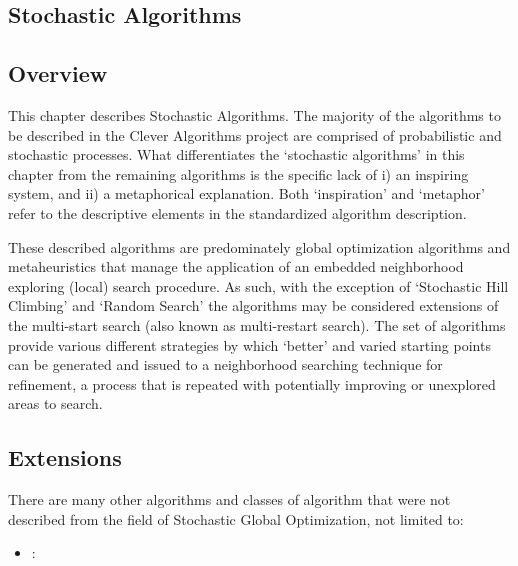 

\renewcommand{\bibsection}{\subsection{\bibname}}
\begin{bibunit}

\chapter{Stochastic Algorithms}
\label{ch:stochastic}

% 
% 
\section{Overview}
This chapter describes Stochastic Algorithms.
The majority of the algorithms to be described in the Clever Algorithms project are comprised of probabilistic and stochastic processes. What differentiates the `stochastic algorithms' in this chapter from the remaining algorithms is the specific lack of i) an inspiring system, and ii) a metaphorical explanation. Both `inspiration' and `metaphor' refer to the descriptive elements in the standardized algorithm description.

These described algorithms are predominately global optimization algorithms and metaheuristics that manage the application of an embedded neighborhood exploring (local) search procedure. As such, with the exception of `Stochastic Hill Climbing' and `Random Search' the algorithms may be considered extensions of the multi-start search (also known as multi-restart search). The set of algorithms provide various different strategies by which `better' and varied starting points can be generated and issued to a neighborhood searching technique for refinement, a process that is repeated with potentially improving or unexplored areas to search. 


% 
% 
\section{Extensions}
There are many other algorithms and classes of algorithm that were not described from the field of Stochastic Global Optimization, not limited to:

\begin{itemize}
	\item \textbf{}:
\end{itemize}

\putbib
\end{bibunit}

